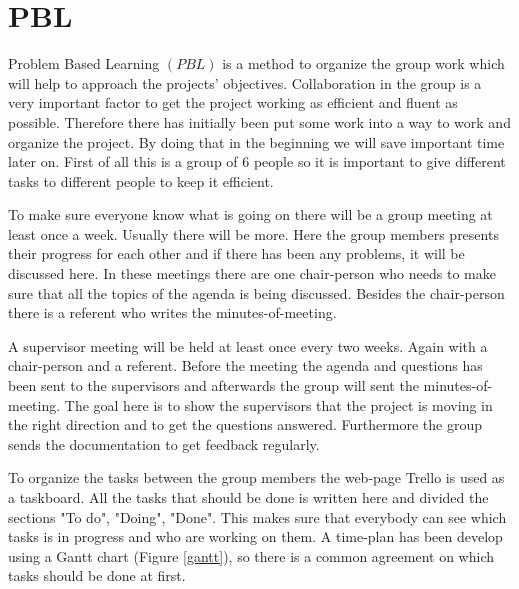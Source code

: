 \section{PBL} 

Problem Based Learning $(PBL)$ is a method to organize the group work which will help to approach the projects' objectives. Collaboration in the group is a very important factor to get the project working as efficient and fluent as possible.
Therefore there has initially been put some work into a way to work and organize the project. By doing that in the beginning we will save important time later on.
First of all this is a group of 6 people so it is important to give different tasks to different people to keep it efficient. 

To make sure everyone know what is going on there will be a group meeting at least once a week. Usually there will be more. Here the group members presents their progress for each other and if there has been any problems, it will be discussed here. In these meetings there are one chair-person who needs to make sure that all the topics of the agenda is being discussed. Besides the chair-person there is a referent who writes the minutes-of-meeting. 

A supervisor meeting will be held at least once every two weeks. Again with a chair-person and a referent. Before the meeting the agenda and questions has been sent to the supervisors and afterwards the group will sent the minutes-of-meeting. The goal here is to show the supervisors that the project is moving in the right direction and to get the questions answered. Furthermore the group sends the documentation to get feedback regularly.

To organize the tasks between the group members the web-page Trello is used as a taskboard. All the tasks that should be done is written here and divided the sections "To do", "Doing", "Done". This makes sure that everybody can see which tasks is in progress and who are working on them. A time-plan has been develop using a Gantt chart (Figure \ref{gantt}), so there is a common agreement on which tasks should be done at first.              

